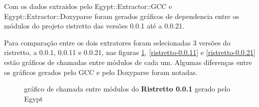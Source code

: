 Com os dados extraidos pelo Egypt::Extractor::GCC e Egypt::Extractor::Doxyparse
foram gerados gráficos de dependencia entre os módulos do projeto ristretto das
versões 0.0.1 até a 0.0.21.

Para comparação entre os dois extratores foram selecionadas 3 versões do
ristretto, a 0.0.1, 0.0.11 e 0.0.21, nas figuras \ref{ristretto-0.0.1},
\ref{ristretto-0.0.11} e \ref{ristretto-0.0.21} estão gráficos de chamadas
entre módulos de cada um. Algumas diferenças entre os gráficos
gerados pelo GCC e pelo Doxyparse foram notadas. 

\begin{figure}
\center
{}
\qquad
{}
\caption{gráfico de chamada entre módulos do {\bf Ristretto 0.0.1} gerado pelo Egypt}
\label{ristretto-0.0.1}
\end{figure}

